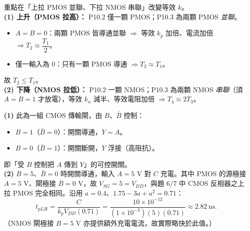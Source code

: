 \documentclass[12pt]{article}
\begin{document}
\sol 重點在「上拉 PMOS 並聯、下拉 NMOS 串聯」改變等效 $k$。\\
\textbf{(1) 上升（PMOS 拉高）：} P10.2 僅一顆 PMOS；P10.3 為兩顆 PMOS \emph{並聯}。
\begin{itemize}[leftmargin=2.2em,itemsep=1pt]
  \item $A=B=0$：兩顆 PMOS 皆導通並聯 $\Rightarrow$ 等效 $k_p$ 加倍、電流加倍 $\Rightarrow T_2\approx\dfrac{T_1}{2}$。
  \item 僅一輸入為 $0$：只有一顆 PMOS 導通 $\Rightarrow T_2\approx T_1$。
\end{itemize}
故 $T_2\le T_1$。\\
\textbf{(2) 下降（NMOS 拉低）：} P10.2 一顆 NMOS；P10.3 為兩顆 NMOS \emph{串聯}（須 $A=B=1$ 才放電），等效 $k_n$ 減半、等效電阻加倍 $\Rightarrow T_4\approx2T_3$。

\begin{minipage}{0.60\linewidth}
\end{minipage}\hfill
\begin{minipage}{0.37\linewidth}
\end{minipage}

\sol
\textbf{(1)} 此為一組 CMOS 傳輸閘，由 $B$、$\bar B$ 控制：
\begin{itemize}[leftmargin=2.2em,itemsep=1pt]
  \item $B=1$（$\bar B=0$）：開關導通，$Y=A$。
  \item $B=0$（$\bar B=1$）：開關斷開，$Y$ 浮接（高阻抗）。
\end{itemize}
即「受 $B$ 控制把 $A$ 傳到 $Y$」的可控開關。\\
\textbf{(2)} $B=5$、$\bar B=0$ 時開關導通，輸入 $A=5$ V 對 $C$ 充電。其中 PMOS 的源極接 $A=5$ V、閘極接 $\bar B=0$ V，故 $V_{SG}=5=V_{DD}$，與題 6/7 中 CMOS 反相器之上拉 PMOS 完全相同。沿用 $a=0.4$、$1.75-3a+a^2=0.71$：
\[ t_{pLH}=\frac{C}{k_pV_{DD}(0.71)}=\frac{10\times10^{-12}}{(1\times10^{-3})(5)(0.71)}\approx2.82\ \text{ns}. \]
（NMOS 閘極接 $B=5$ V 亦提供額外充電電流，故實際略快於此值。）
\end{document}
